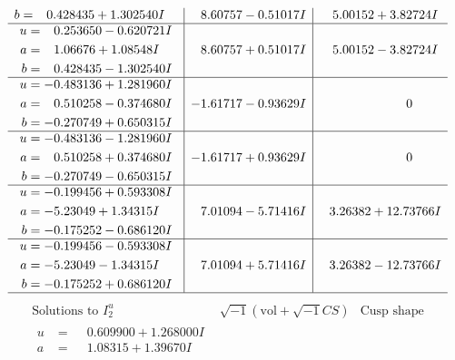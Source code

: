 \documentclass[1p]{elsarticle_modified}
\theoremstyle{definition}
\newcommand{\I}{\sqrt{-1}}
\begin{document}
$$\begin{array}{c|c|c}
\begin{aligned}
b &= \phantom{-}0.428435 + 1.302540 I\end{aligned}
 & \phantom{-}8.60757 - 0.51017 I & \phantom{-}5.00152 + 3.82724 I \\ \hline\begin{aligned}
u &= \phantom{-}0.253650 - 0.620721 I \\
a &= \phantom{-}1.06676 + 1.08548 I \\
b &= \phantom{-}0.428435 - 1.302540 I\end{aligned}
 & \phantom{-}8.60757 + 0.51017 I & \phantom{-}5.00152 - 3.82724 I \\ \hline\begin{aligned}
u &= -0.483136 + 1.281960 I \\
a &= \phantom{-}0.510258 - 0.374680 I \\
b &= -0.270749 + 0.650315 I\end{aligned}
 & -1.61717 - 0.93629 I & \phantom{-0.000000 } 0 \\ \hline\begin{aligned}
u &= -0.483136 - 1.281960 I \\
a &= \phantom{-}0.510258 + 0.374680 I \\
b &= -0.270749 - 0.650315 I\end{aligned}
 & -1.61717 + 0.93629 I & \phantom{-0.000000 } 0 \\ \hline\begin{aligned}
u &= -0.199456 + 0.593308 I \\
a &= -5.23049 + 1.34315 I \\
b &= -0.175252 - 0.686120 I\end{aligned}
 & \phantom{-}7.01094 - 5.71416 I & \phantom{-}3.26382 + 12.73766 I \\ \hline\begin{aligned}
u &= -0.199456 - 0.593308 I \\
a &= -5.23049 - 1.34315 I \\
b &= -0.175252 + 0.686120 I\end{aligned}
 & \phantom{-}7.01094 + 5.71416 I & \phantom{-}3.26382 - 12.73766 I\\
 \hline 
 \end{array}$$\newpage$$\begin{array}{c|c|c}  
\text{Solutions to }I^u_{2}& \I (\text{vol} + \sqrt{-1}CS) & \text{Cusp shape}\\
 \hline 
\begin{aligned}
u &= \phantom{-}0.609900 + 1.268000 I \\
a &= \phantom{-}1.08315 + 1.39670 I \\

\end{aligned}
\end{array}$$
\end{document}
